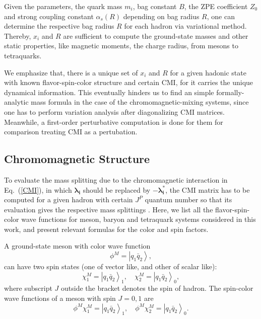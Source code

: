 \documentclass[prd,twocolumn,floatfix,nofootinbib]{revtex4}
\begin{document}
Given the parameters, the quark mass $m_{i}$, bag constant $B$, the ZPE coefficient $Z_{0}$ and strong coupling constant $\alpha_{s}(R)$ depending on bag radius $R$, one can determine the respective bag radius $R$ for each hadron via variational method.
Thereby, $x_{i}$ and $R$ are sufficient to compute the ground-state masses and other static properties, like magnetic moments, the charge radius, from mesons to tetraquarks. 

We emphasize that, there is a unique set of $x_{i}$ and $R$ for a given hadonic state with known flavor-spin-color structure and certain CMI, for it  carries the unique dynamical information. 
This eventually hinders us to find an simple formally-analytic mass formula in the case of the chromomagnetic-mixing systems, since one has to perform variation analysis after diagonalizing CMI matrices. 
Meanwhile, a first-order perturbative computation is done for them for comparison treating CMI as a pertubation. 


\subsection{Chromomagnetic Structure}
To evaluate the mass splitting due to the chromomagnetic interaction in Eq.~(\ref{CMI}), in which $\boldsymbol{\lambda_{i}}$ should be replaced by $-\boldsymbol{\lambda_{i}^{\ast}}$, 
the CMI matrix has to be computed for a given hadron with certain $J^{P}$ quantum number so that its evaluation gives the respective mass splittings \cite{Luo:2017eub}. 
Here, we list all the flavor-spin-color wave functions for meson, baryon and tetraquark systems considered in this work, and present relevant formulas for the color and spin factors.

A ground-state meson with color wave function
\begin{equation}\label{colorM}
    \phi^{M}=\left| q_{1}\bar{q}_{2} \right\rangle,
\end{equation}
can have two spin states (one of vector like, and other of scalar like):
\begin{equation}\label{spinM}
    \chi_{1}^{M}={\left| q_{1}\bar{q}_{2} \right\rangle}_{1}, \quad \chi_{2}^{M}={\left| q_{1}\bar{q}_{2} \right\rangle}_{0},
\end{equation}
where subscript $J$ outside the bracket denotes the spin of hadron. The spin-color wave functions of a meson with spin $J=0,1$ are
\begin{equation}\label{colorspinM}
    \phi^{M}\chi_{1}^{M}={\left| q_{1}\bar{q}_{2} \right\rangle}_{1}, \quad \phi^{M}\chi_{2}^{M}={\left| q_{1}\bar{q}_{2} \right\rangle}_{0}.
\end{equation}
\end{document}
